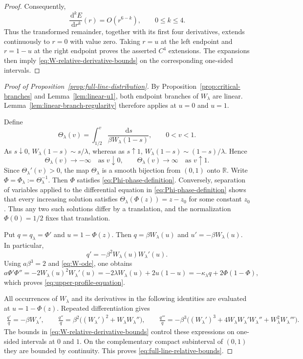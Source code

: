 \documentclass[12pt,preprint]{amsart}
\numberwithin{equation}{section}
\theoremstyle{plain}
\theoremstyle{definition}
\newcommand{\dd}{\,\mathrm d}
\begin{document}
\begin{proof}
Consequently,
\[
 \frac{\dd^kE}{\dd r^k}(r)=O(r^{6-k}),
 \qquad 0\le k\le4.
\]
Thus the transformed remainder, together with its first four derivatives,
extends continuously to $r=0$ with value zero.  Taking $r=u$ at the left
endpoint and $r=1-u$ at the right endpoint proves the asserted $C^4$
extensions.  The expansions then imply \eqref{eq:W-relative-derivative-bounds}
on the corresponding one-sided intervals.
\end{proof}

\begin{proof}[Proof of Proposition~\ref{prop:full-line-distribution}]
By Proposition~\ref{prop:critical-branches} and
Lemma~\ref{lem:linear-u1}, both endpoint branches of $W_{\lambda}$ are
linear.  Lemma~\ref{lem:linear-branch-regularity} therefore applies at
$u=0$ and $u=1$.

Define
\begin{equation*}
 \Theta_{\lambda}(v)=\int_{1/2}^{v}
 \frac{\dd s}{\beta W_{\lambda}(1-s)},
 \qquad 0<v<1.
\end{equation*}
As $s\downarrow0$,
$W_{\lambda}(1-s)\sim s/\lambda$, whereas as $s\uparrow1$,
$W_{\lambda}(1-s)\sim(1-s)/\lambda$.  Hence
\[
 \Theta_{\lambda}(v)\longrightarrow-\infty
 \quad\text{as }v\downarrow0,
 \qquad
 \Theta_{\lambda}(v)\longrightarrow\infty
 \quad\text{as }v\uparrow1.
\]
Since $\Theta_{\lambda}'(v)>0$, the map $\Theta_{\lambda}$ is a smooth bijection from
$(0,1)$ onto $\mathbb R$.  Write
$\Phi=\Phi_\lambda:=\Theta_{\lambda}^{-1}$.  Then \(\Phi\) satisfies
\eqref{eq:Phi-phase-definition}.  Conversely, separation of variables
applied to the differential equation in \eqref{eq:Phi-phase-definition}
shows that every increasing solution satisfies
$\Theta_{\lambda}(\Phi(z))=z-z_0$ for some constant $z_0$.  Thus any two such
solutions differ by a translation, and the normalization $\Phi(0)=1/2$
fixes that translation.

Put $q=q_\lambda=\Phi'$ and $u=1-\Phi(z)$.  Then
$q=\beta W_{\lambda}(u)$ and
$u'=-\beta W_{\lambda}(u)$.  In particular,
\[
 q'=-\beta^2W_{\lambda}(u)W_{\lambda}'(u).
\]
Using $a\beta^3=2$ and \eqref{eq:W-ode}, one obtains
\[
 a\Phi'\Phi''
 =-2W_{\lambda}(u)^2W_{\lambda}'(u)
 =-2\lambda W_{\lambda}(u)+2u(1-u)
 =-\kappa_{\lambda}q+2\Phi(1-\Phi),
\]
which proves \eqref{eq:upper-profile-equation}.

All occurrences of $W_{\lambda}$ and its derivatives in the following identities
are evaluated at $u=1-\Phi(z)$.  Repeated differentiation gives
\[
\begin{aligned}
 \frac{q'}q
 =-\beta W_{\lambda}',\qquad
 \frac{q''}q
 =\beta^2\bigl((W_{\lambda}')^2
   +W_{\lambda}W_{\lambda}''\bigr),\qquad
 \frac{q'''}q
 =-\beta^3\bigl((W_{\lambda}')^3
   +4W_{\lambda}W_{\lambda}'W_{\lambda}''
   +W_{\lambda}^2W_{\lambda}'''\bigr).
\end{aligned}
\]
The bounds in \eqref{eq:W-relative-derivative-bounds} control these
expressions on one-sided intervals at $0$ and $1$.  On the complementary
compact subinterval of $(0,1)$ they are bounded by continuity.  This proves
\eqref{eq:full-line-relative-bounds}.


\end{proof}
\end{document}
